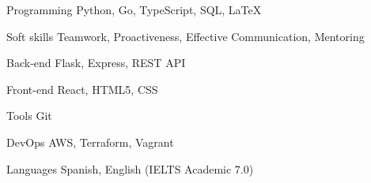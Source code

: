 

\begin{cvskills}

  \cvskill
    {Programming} %
    {Python, Go, TypeScript, SQL, \LaTeX} %
    
  \cvskill
    {Soft skills} %
    {Teamwork, Proactiveness, Effective Communication, Mentoring} %

  \cvskill
    {Back-end} %
    {Flask, Express, REST API} %

  \cvskill
    {Front-end} %
    {React, HTML5, CSS} %
    
  \cvskill
    {Tools} %
    {Git} %

  \cvskill
    {DevOps} %
    {AWS, Terraform, Vagrant} %

  \cvskill
    {Languages} %
    {Spanish, English (IELTS Academic 7.0)} %

\end{cvskills}
